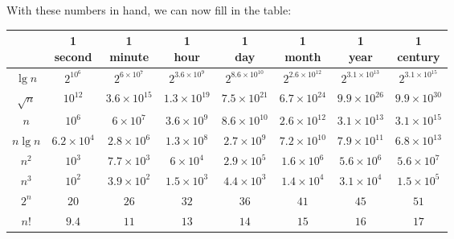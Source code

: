 \documentclass[8pt,a4paper]{article}
\begin{document}
With these numbers in hand, we can now fill in the table:

\begin{center}
  \begin{tabular}{ *{8}{c|} }
    & \shortstack{1 \\ second} & \shortstack{1 \\ minute} & \shortstack{1 \\ hour}%
      & \shortstack{1 \\ day} & \shortstack{1 \\ month} & \shortstack{1 \\ year}%
      & \shortstack{1 \\ century} \\ \hline

    $\lg n$ & $2^{10^{6}}$ & $2^{6 \times 10^{7}}$ & $2^{3.6 \times 10^{9}}$ &%
    $2^{8.6 \times 10^{10}}$ & $2^{2.6 \times 10^{12}}$ & $2^{3.1 \times 10^{13}}$ & $2^{3.1 \times 10^{15}}$ \\ \hline

    $\sqrt{n}$ & $10^{12}$ & $3.6 \times 10^{15}$ & $1.3 \times 10^{19}$ & $7.5 \times 10^{21}$ &%
      $6.7 \times 10^{24}$ & $9.9 \times 10^{26}$ & $9.9 \times 10^{30}$ \\ \hline

    $n$ & $10^{6}$ & $6 \times 10^{7}$ & $3.6 \times 10^{9}$ & $8.6 \times 10^{10}$ &%
      $2.6 \times 10^{12}$ & $3.1 \times 10^{13}$ & $3.1\times 10^{15}$ \\ \hline

    $n \lg n$ & $6.2 \times 10^{4}$ & $2.8 \times 10^{6}$ & $1.3 \times 10^{8}$ &%
      $2.7 \times 10^{9}$ & $7.2 \times 10^{10}$ & $7.9 \times 10^{11}$ & $6.8 \times 10^{13}$ \\ \hline

    $n^{2}$ & $10^{3}$ & $7.7 \times 10^{3}$ & $6 \times 10^{4}$ & $2.9 \times 10^{5}$ &%
      $1.6 \times 10^{6}$ & $5.6 \times 10^{6}$ & $5.6 \times 10^{7}$ \\ \hline

    $n^{3}$ & $10^{2}$ & $3.9 \times 10^{2}$ & $1.5 \times 10^{3}$ & $4.4 \times 10^{3}$ &%
      $1.4 \times 10^{4}$ & $3.1 \times 10^{4}$ & $1.5 \times 10^{5}$ \\ \hline

    $2^{n}$ & $20$ & $26$ & $32$ & $36$ & $41$ & $45$ & $51$ \\ \hline

    $n!$ & $9.4$ & $11$ & $13$ & $14$ & $15$ & $16$ & $17$ \\ \hline
    \end{tabular}
\end{center}
\end{document}
